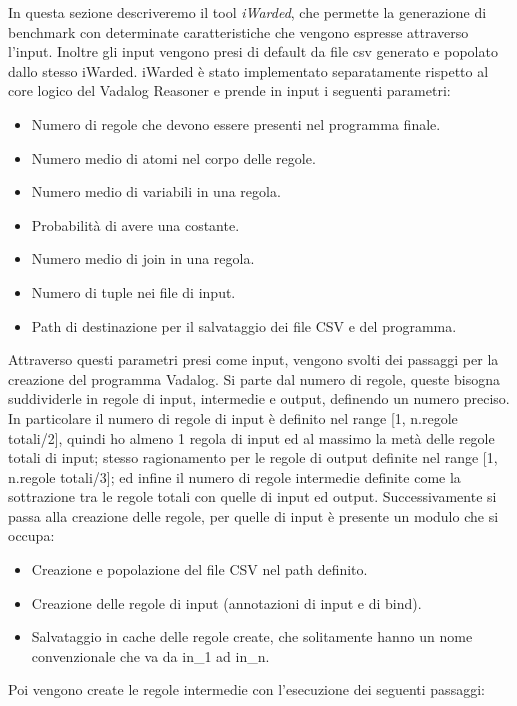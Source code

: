In questa sezione descriveremo il tool \emph{iWarded}, che permette la generazione di benchmark con determinate caratteristiche che vengono espresse attraverso l'input. Inoltre gli input vengono presi di default da file csv generato e popolato dallo stesso iWarded. \newline
iWarded è stato implementato separatamente rispetto al core logico del Vadalog Reasoner e prende in input i seguenti parametri: 
\begin{itemize}
	\item Numero di regole che devono essere presenti nel programma finale.
	\item Numero medio di atomi nel corpo delle regole.
	\item Numero medio di variabili in una regola.
	\item Probabilità di avere una costante.
	\item Numero medio di join in una regola.
	\item Numero di tuple nei file di input. 
	\item Path di destinazione per il salvataggio dei file CSV e del programma.
\end{itemize}
Attraverso questi parametri presi come input, vengono svolti dei passaggi per la creazione del programma Vadalog. \newline
Si parte dal numero di regole, queste bisogna suddividerle in regole di input, intermedie e output, definendo un numero preciso. In particolare il numero di regole di input è definito nel range [1, n.regole totali/2], quindi ho almeno 1 regola di input ed al massimo la metà delle regole totali di input; stesso ragionamento per le regole di output definite nel range [1, n.regole totali/3]; ed infine il numero di regole intermedie definite come la sottrazione tra le regole totali con quelle di input ed output. \newline
Successivamente si passa alla creazione delle regole, per quelle di input è presente un modulo che si occupa:
\begin{itemize}
	\item Creazione e popolazione del file CSV nel path definito.
	\item Creazione delle regole di input (annotazioni di input e di bind).
	\item Salvataggio in cache delle regole create, che solitamente hanno un nome convenzionale che va da in\_1 ad in\_n.
\end{itemize}
Poi vengono create le regole intermedie con l'esecuzione dei seguenti passaggi:
